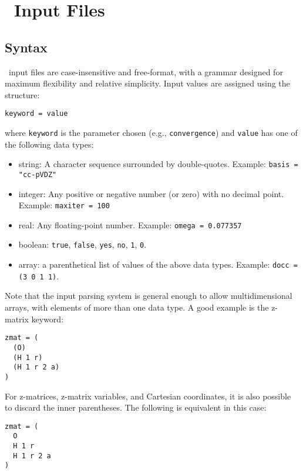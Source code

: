 \section{\PSIthree\ Input Files} \label{input}

\subsection{Syntax} \label{syntax}
\PSIthree\ input files are case-insensitive and free-format, with
a grammar designed for maximum flexibility and relative simplicity.
Input values are assigned using the structure:
\begin{verbatim}
keyword = value
\end{verbatim}
where {\tt keyword} is the parameter chosen (e.g., {\tt convergence})
and {\tt value} has one of the following data types:
\begin{itemize}
\item string: A character sequence surrounded by double-quotes.
  Example: {\tt basis = "cc-pVDZ"}
\item integer: Any positive or negative number (or zero) with no
  decimal point.  Example: {\tt maxiter = 100}
\item real: Any floating-point number.  Example: {\tt omega = 0.077357}
\item boolean: {\tt true}, {\tt false}, {\tt yes}, {\tt no}, {\tt 1},
  {\tt 0}.
\item array: a parenthetical list of values of the above data types.
  Example: {\tt docc = (3 0 1 1)}.  
\end{itemize}
Note that the input parsing system is general enough to allow
multidimensional arrays, with elements of more than one data type.  A
good example is the z-matrix keyword:
\begin{verbatim}
zmat = (
  (O)
  (H 1 r)
  (H 1 r 2 a)
)
\end{verbatim}
For z-matrices, z-matrix variables, and Cartesian coordinates, 
it is also possible to discard the inner parentheses.
The following is equivalent in this case:
\begin{verbatim}
zmat = (
  O
  H 1 r
  H 1 r 2 a
)
\end{verbatim}

